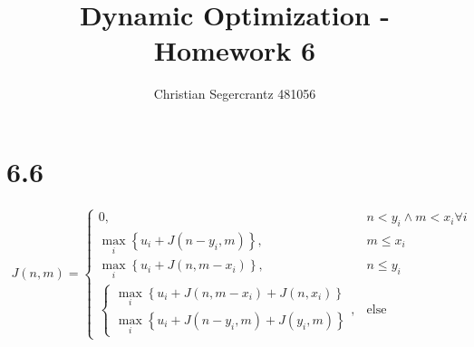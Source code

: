 \documentclass{article}
\title{Dynamic Optimization - Homework 6}
\author{Christian Segercrantz 481056}
\begin{document}
	\maketitle
	\pagebreak
	\section*{6.6}
	
	\begin{align}
		J(n,m) =
		\begin{cases}
			0, & n < y_i \land m < x_i \forall i\\
			\max_i \left\lbrace u_i + J(n-y_i, m) \right\rbrace, & m \leq x_i \\
			\max_i \left\lbrace u_i + J(n, m-x_i) \right\rbrace, & n \leq y_i \\
			\begin{cases}
				\max_i \left\lbrace u_i + J(n, m-x_i) + J(n, x_i) \right\rbrace \\
				\max_i \left\lbrace u_i + J(n- y_i, m) + J(y_i, m) \right\rbrace
			\end{cases}, & \text{else}
		\end{cases}
	\end{align}
\end{document}
